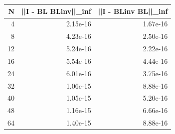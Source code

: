 \begin{tabular}{rrr}
\toprule
 N &  ||I - BL BLinv||\_inf &  ||I - BLinv BL||\_inf \\
\midrule
 4 &              2.15e-16 &              1.67e-16 \\
 8 &              4.23e-16 &              2.50e-16 \\
12 &              5.24e-16 &              2.22e-16 \\
16 &              5.54e-16 &              4.44e-16 \\
24 &              6.01e-16 &              3.75e-16 \\
32 &              1.06e-15 &              8.88e-16 \\
40 &              1.05e-15 &              5.20e-16 \\
48 &              1.16e-15 &              6.66e-16 \\
64 &              1.40e-15 &              8.88e-16 \\
\bottomrule
\end{tabular}
